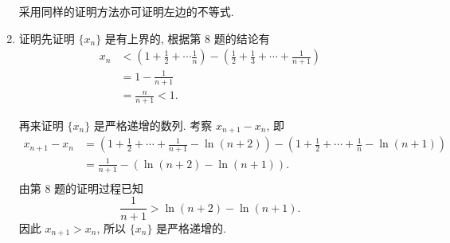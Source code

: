 \begin{enumerate}
        采用同样的证明方法亦可证明左边的不等式.
    \item {\heiti 证明}\quad 先证明 $\{x_n\}$ 是有上界的, 根据第 8 题的结论有
        \begin{align*}
            x_n &< \left(1 + \frac 12 + \cdots \frac 1n\right) - \left(\frac 12 + \frac13 + \cdots + \frac{1}{n+1}\right) \\
            &= 1 - \frac{1}{n+1} \\
            &= \frac{n}{n+1} < 1.
        \end{align*}
        
        再来证明 $\{x_n\}$ 是严格递增的数列. 考察 $x_{n+1} - x_n$, 即
        \begin{align*}
            x_{n+1} - x_n &= \left(1 + \frac12 + \cdots + \frac{1}{n+1} - \ln(n+2)\right) - \left(1 + \frac12 + \cdots + \frac1n - \ln(n+1)\right) \\
            &= \frac{1}{n+1} - \left(\ln(n+2) - \ln(n+1)\right). \\
        \end{align*}
        由第 8 题的证明过程已知 
        \[
            \frac{1}{n+1} > \ln(n+2) - \ln(n+1).
        \]
        因此 $x_{n+1} > x_n$, 所以 $\{x_n\}$ 是严格递增的.
        

\end{enumerate}
